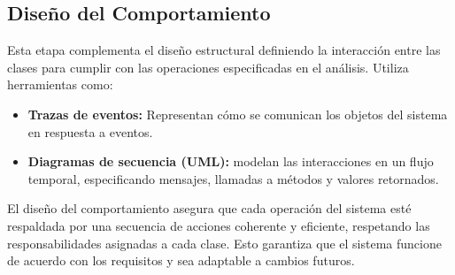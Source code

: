  \subsection{Diseño del Comportamiento}
 Esta etapa complementa el diseño estructural definiendo la interacción entre las clases para cumplir con las operaciones especificadas en el análisis. Utiliza herramientas como:
 
\begin{itemize}
        \item \textbf{Trazas de eventos:} Representan cómo se comunican los objetos del sistema en respuesta a eventos.
        \item \textbf{Diagramas de secuencia (UML):} modelan las interacciones en un flujo temporal, especificando mensajes, llamadas a métodos y valores retornados.
\end{itemize}

El diseño del comportamiento asegura que cada operación del sistema esté respaldada por una secuencia de acciones coherente y eficiente, respetando las responsabilidades asignadas a cada clase. Esto garantiza que el sistema funcione de acuerdo con los requisitos y sea adaptable a cambios futuros.
